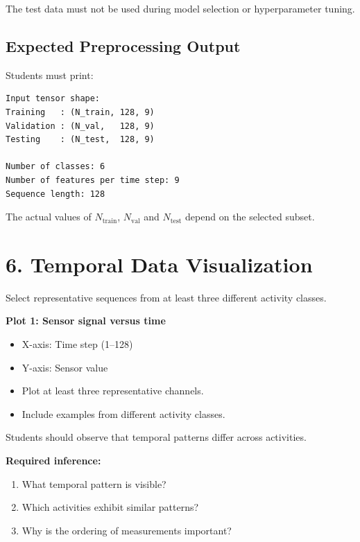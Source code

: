 \documentclass[10pt]{article}
\begin{document}
The test data must not be used during model selection or hyperparameter tuning.

\subsection*{Expected Preprocessing Output}

Students must print:

\begin{verbatim}
Input tensor shape:
Training   : (N_train, 128, 9)
Validation : (N_val,   128, 9)
Testing    : (N_test,  128, 9)

Number of classes: 6
Number of features per time step: 9
Sequence length: 128
\end{verbatim}

The actual values of $N_{\mathrm{train}}$, $N_{\mathrm{val}}$ and
$N_{\mathrm{test}}$ depend on the selected subset.

\section*{6. Temporal Data Visualization}

Select representative sequences from at least three different activity
classes.

\textbf{Plot 1: Sensor signal versus time}

\begin{itemize}
\item X-axis: Time step (1--128)
\item Y-axis: Sensor value
\item Plot at least three representative channels.
\item Include examples from different activity classes.
\end{itemize}

Students should observe that temporal patterns differ across activities.

\textbf{Required inference:}

\begin{enumerate}
\item What temporal pattern is visible?
\item Which activities exhibit similar patterns?
\item Why is the ordering of measurements important?
\end{enumerate}

\end{document}
